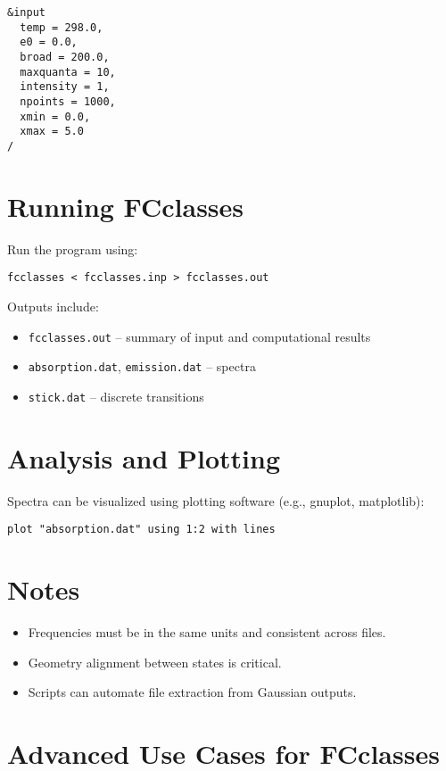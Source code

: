 \begin{verbatim}
&input
  temp = 298.0,
  e0 = 0.0,
  broad = 200.0,
  maxquanta = 10,
  intensity = 1,
  npoints = 1000,
  xmin = 0.0,
  xmax = 5.0
/
\end{verbatim}

\section{Running FCclasses}

Run the program using:

\begin{verbatim}
fcclasses < fcclasses.inp > fcclasses.out
\end{verbatim}

Outputs include:

\begin{itemize}
    \item \texttt{fcclasses.out} – summary of input and computational results
    \item \texttt{absorption.dat}, \texttt{emission.dat} – spectra
    \item \texttt{stick.dat} – discrete transitions
\end{itemize}

\section{Analysis and Plotting}

Spectra can be visualized using plotting software (e.g., gnuplot, matplotlib):

\begin{verbatim}
plot "absorption.dat" using 1:2 with lines
\end{verbatim}

\section*{Notes}

\begin{itemize}
    \item Frequencies must be in the same units and consistent across files.
    \item Geometry alignment between states is critical.
    \item Scripts can automate file extraction from Gaussian outputs.
\end{itemize}


\section*{Advanced Use Cases for FCclasses}

